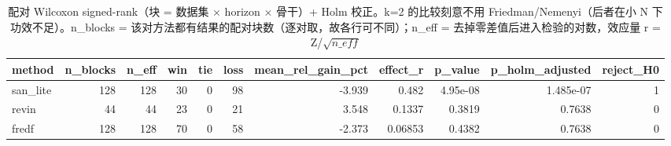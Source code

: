 \begin{table}[htbp]
\centering
\small
\caption{配对 Wilcoxon signed-rank（块 = 数据集 × horizon × 骨干）+ Holm 校正。k=2 的比较刻意不用 Friedman/Nemenyi（后者在小 N 下功效不足）。n\_blocks = 该对方法都有结果的配对块数（逐对取，故各行可不同）；n\_eff = 去掉零差值后进入检验的对数，效应量 r = Z/$\sqrt{n\_eff}$}
\label{tab:stats_wilcoxon}
\begin{tabular}{lrrrrrrrrrr}
\toprule
method & n\_blocks & n\_eff & win & tie & loss & mean\_rel\_gain\_pct & effect\_r & p\_value & p\_holm\_adjusted & reject\_H0 \\
\midrule
san\_lite & 128 & 128 & 30 & 0 & 98 & -3.939 & 0.482 & 4.95e-08 & 1.485e-07 & 1 \\
revin & 44 & 44 & 23 & 0 & 21 & 3.548 & 0.1337 & 0.3819 & 0.7638 & 0 \\
fredf & 128 & 128 & 70 & 0 & 58 & -2.373 & 0.06853 & 0.4382 & 0.7638 & 0 \\
\bottomrule
\end{tabular}
\end{table}
